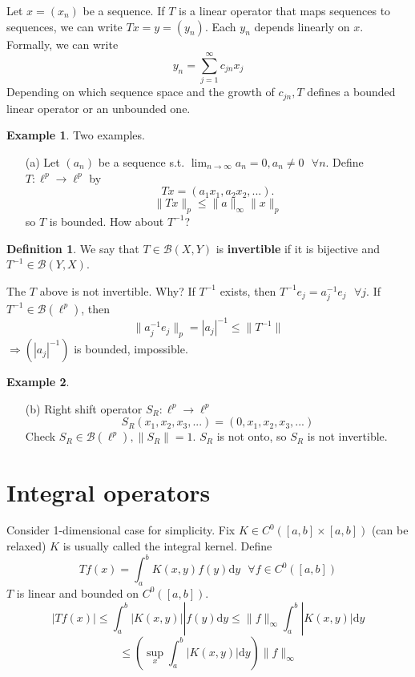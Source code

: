 \documentclass{article}
\theoremstyle{definition}
\newtheorem{ex}{Example}
\newtheorem{dfn}{Definition}
\newcommand{\sfa}{\text{  } \forall}
\begin{document}
Let $x = (x_n)$ be a sequence.
If $T$ is a linear operator that maps sequences to sequences, we can write $T x = y = (y_n)$.
Each $y_n$ depends linearly on $x$.
Formally, we can write 
\[
	y_n = \sum_{j = 1}^\infty c_{jn} x_j
\]
Depending on which sequence space and the growth of $c_{jn}, T$ defines a bounded linear operator or an unbounded one.

\begin{ex}
	Two examples.
	\begin{enumerate}
		\item[(a)] Let $(a_n)$ be a sequence s.t. $\lim_{n \to \infty} a_n = 0, a_n \neq 0 \sfa n$.
			Define $T: \ell^p \to \ell^p$ by 
			\[
				T x= (a_1 x_1, a_2x_2,...).
			\]
			\[
				\|T x\|_p \leq \|a\|_\infty \|x\|_p
			\]
			so $T$ is bounded.
			How about $T^{-1}$?
	\end{enumerate}
\end{ex}

\begin{dfn}
	We say that $T \in \mathcal{B}(X, Y)$ is \textbf{invertible} if it is bijective and $T^{-1} \in \mathcal{B}(Y, X)$.
\end{dfn}

The $T$ above is not invertible.
Why? 
If $T^{-1}$ exists, then $T^{-1} e_j = a_j^{-1} e_j \sfa j$.
If $T^{-1} \in \mathcal{B}(\ell^p)$, then
\[
	\|a_j^{-1} e_j \|_p = |a_j|^{-1} \leq \|T^{-1}\|
\]
$\Rightarrow (|a_j|^{-1})$ is bounded, impossible.

\setcounter{ex}{0}
\begin{ex}
	\begin{enumerate}
		\item[(b)] Right shift operator $S_R : \ell^p \to \ell^p$
			\[
				S_R(x_1, x_2, x_3, ...) = (0, x_1, x_2, x_3, ...)
			\]
			Check $S_R \in \mathcal{B}(\ell^p), \|S_R\| = 1$.
			$S_R$ is not onto, so $S_R$ is not invertible.
	\end{enumerate}
\end{ex}

\section*{Integral operators}

Consider 1-dimensional case for simplicity.
Fix $K \in C^0([a, b] \times [a, b])$ (can be relaxed)
$K$ is usually called the integral kernel.
Define 
\[
	T f(x) = \int_a^b K(x, y) f(y) \mathrm{d} y \sfa f \in C^0([a, b])
\]
$T$ is linear and bounded on $C^0([a, b])$.
\[
	|T f(x)| \leq \int_a^b |K(x, y)||f(y) \mathrm{d} y \leq \|f\|_\infty \int_a^b |K(x, y)| \mathrm{d} y
\]
\[
	\leq (\sup_x \int_a^b |K(x, y)| \mathrm{d} y) \|f\|_\infty
\]
\end{document}
